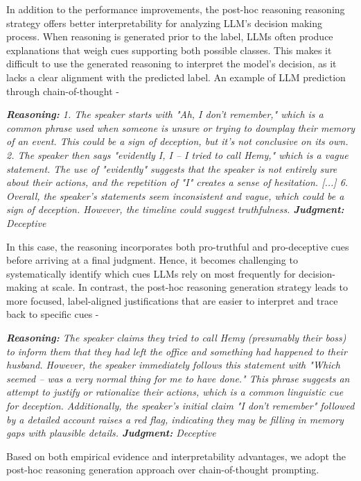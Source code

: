 In addition to the performance improvements, the post-hoc reasoning reasoning strategy offers better interpretability for analyzing LLM's decision making process. When reasoning is generated prior to the label, LLMs often produce explanations that weigh cues supporting both possible classes. This makes it difficult to use the generated reasoning to interpret the model’s decision, as it lacks a clear alignment with the predicted label. An example of LLM prediction through chain-of-thought -

\textit{ \textbf{Reasoning:} 1. The speaker starts with "Ah, I don't remember," which is a common phrase used when someone is unsure or trying to downplay their memory of an event. This could be a sign of deception, but it's not conclusive on its own.
2. The speaker then says "evidently I, I -- I tried to call Hemy," which is a vague statement. The use of "evidently" suggests that the speaker is not entirely sure about their actions, and the repetition of "I" creates a sense of hesitation.
[...] 6. Overall, the speaker's statements seem inconsistent and vague, which could be a sign of deception. However, the timeline could suggest truthfulness.
\textbf{Judgment:} Deceptive}

In this case, the reasoning incorporates both pro-truthful and pro-deceptive cues before arriving at a final judgment. Hence, it becomes challenging to systematically identify which cues LLMs rely on most frequently for decision-making at scale. In contrast, the post-hoc reasoning generation strategy leads to more focused, label-aligned justifications that are easier to interpret and trace back to specific cues - 

\textit{\textbf{Reasoning:} The speaker claims they tried to call Hemy (presumably their boss) to inform them that they had left the office and something had happened to their husband. However, the speaker immediately follows this statement with "Which seemed -- was a very normal thing for me to have done." This phrase suggests an attempt to justify or rationalize their actions, which is a common linguistic cue for deception. Additionally, the speaker's initial claim "I don't remember" followed by a detailed account raises a red flag, indicating they may be filling in memory gaps with plausible details.
\textbf{Judgment:} Deceptive
}

Based on both empirical evidence and interpretability advantages, we adopt the post-hoc reasoning generation approach over chain-of-thought prompting.
